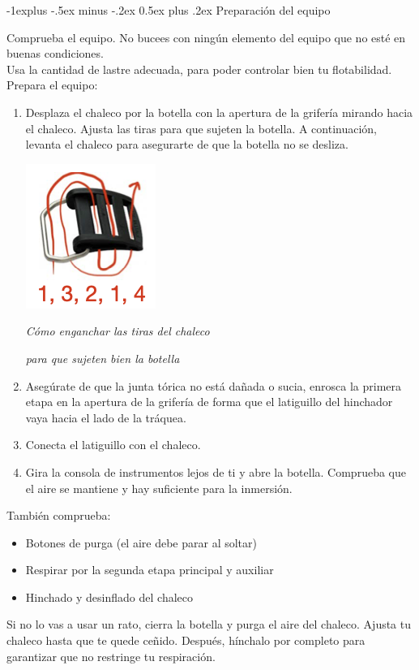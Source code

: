 \documentclass[10pt,landscape]{article}
\makeatletter
\renewcommand{\subsection}{\@startsection{subsection}{2}{0mm}%
                                {-1explus -.5ex minus -.2ex}%
                                {0.5ex plus .2ex}%
                                {\normalfont\normalsize\bfseries}}
\makeatother
\begin{document}
\begin{multicols*}{3}
\subsection{Preparación del equipo}

Comprueba el equipo. No bucees con ningún elemento del equipo que no esté en buenas condiciones.\\
Usa la cantidad de lastre adecuada, para poder controlar bien tu flotabilidad.\\
Prepara el equipo:
\begin{enumerate}
\item Desplaza el chaleco por la botella con la apertura de la grifería mirando hacia el chaleco. Ajusta las tiras para que sujeten la botella. A continuación, levanta el chaleco para asegurarte de que la botella no se desliza.
\begin{center}
\includegraphics[width=0.3\columnwidth]{enganche_botella.png}
\centerline{\textit{Cómo enganchar las tiras del chaleco}}
\centerline{\textit{para que sujeten bien la botella}}
\end{center}

\item Asegúrate de que la junta tórica no está dañada o sucia, enrosca la primera etapa en la apertura de la grifería de forma que el latiguillo del hinchador vaya hacia el lado de la tráquea.
\item Conecta el latiguillo con el chaleco.
\item Gira la consola de instrumentos lejos de ti y abre la botella. Comprueba que el aire se mantiene y hay suficiente para la inmersión.
\end{enumerate}
También comprueba:
\begin{itemize}
\item Botones de purga (el aire debe parar al soltar)
\item Respirar por la segunda etapa principal y auxiliar
\item Hinchado y desinflado del chaleco
\end{itemize}
Si no lo vas a usar un rato, cierra la botella y purga el aire del chaleco.
Ajusta tu chaleco hasta que te quede ceñido. Después, hínchalo por completo para garantizar que no restringe tu respiración.


\end{multicols*}
\end{document}

